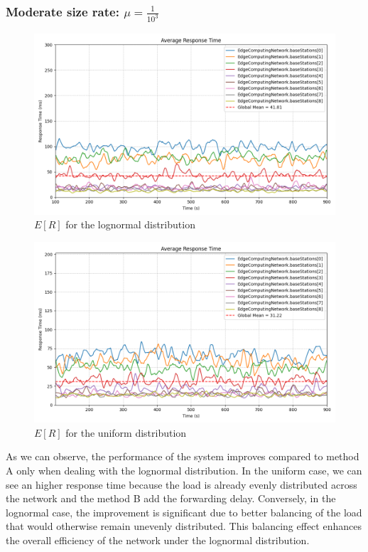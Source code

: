 \documentclass{report}
\begin{document}
\subsubsection*{Moderate size rate: $\mu=\frac{1}{10^3}$}

\begin{figure}[H]
    \centering
    \includegraphics[width=\textwidth]{img/plots/log_1e3_B/resptime.png}
    \caption{$E[R]$ for the lognormal distribution}
\end{figure}

\begin{figure}[H]
    \centering
    \includegraphics[width=\textwidth]{img/plots/uni_1e3_B/resptime.png}
    \caption{$E[R]$ for the uniform distribution}
\end{figure}

As we can observe, the performance of the system improves compared to method A only when dealing with the lognormal distribution.
In the uniform case, we can see an higher response time because the load is already evenly distributed across the network and the method B add the forwarding delay.
Conversely, in the lognormal case, the improvement is significant due to better balancing of the load that would otherwise remain unevenly distributed.
This balancing effect enhances the overall efficiency of the network under the lognormal distribution.
\end{document}
